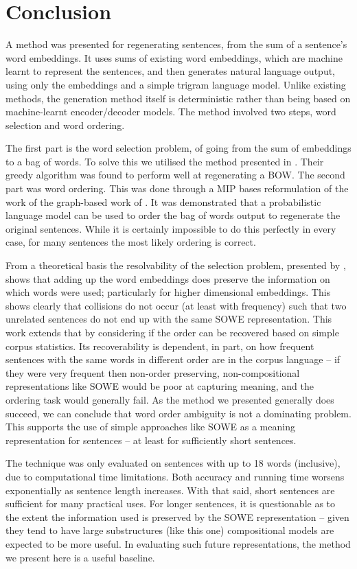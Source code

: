 {\section{Conclusion} \label{conclusionSS}
A method was presented for regenerating sentences, from the sum of a sentence's word embeddings. It uses sums of existing word embeddings, which are machine learnt to represent the sentences, and then generates natural language output, using only the embeddings and a simple trigram language model. Unlike existing methods, the generation method itself is deterministic rather than being based on machine-learnt encoder/decoder models. The method involved two steps, word selection and word ordering.

The first part is  the word selection problem, of going from the sum of embeddings to a bag of words. To solve this we utilised the method presented in \textcite{White2015BOWgen}. Their greedy algorithm was found to perform well at regenerating a BOW. The second part was word ordering. This was done through a MIP bases reformulation of the work of the graph-based work of \textcite{Horvat2014}. It was demonstrated that a probabilistic language model can be used to order the bag of words output to regenerate the original sentences. While it is certainly impossible to do this perfectly in every case, for many sentences the most likely ordering is correct.

From a theoretical basis the resolvability of the selection problem, presented by \textcite{White2015BOWgen}, shows that adding up the word embeddings does preserve the information on which words were used; particularly for higher dimensional embeddings. This shows clearly that collisions do not occur (at least with frequency) such that two unrelated sentences do not end up with the same SOWE representation. 
This work extends that by considering if the order can be recovered based on simple corpus statistics. Its recoverability is dependent, in part, on how frequent sentences with the same words in different order are in the corpus language -- if they were very frequent then non-order preserving, non-compositional representations like SOWE would be poor at capturing meaning, and the ordering task would generally fail. As the method we presented generally does succeed, we can conclude that word order ambiguity is not a dominating problem. This supports the use of simple approaches like SOWE as a meaning representation for sentences -- at least for sufficiently short sentences.

The technique was only evaluated on sentences with up to 18 words (inclusive), due to computational time limitations. Both accuracy and running time worsens exponentially as sentence length increases. With that said, short sentences are sufficient for many practical uses. For longer sentences, it is questionable as to the extent the information used is preserved by the SOWE representation -- given they tend to have large substructures (like this one) compositional models are expected to be more useful. In evaluating such future representations, the method we present here is a useful baseline.

}
